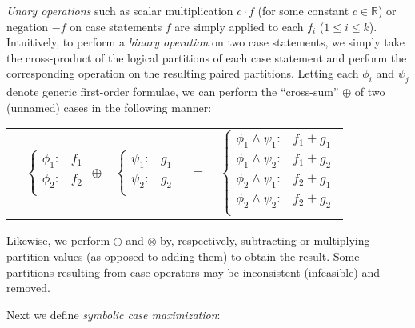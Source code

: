 \emph{Unary operations} such as scalar multiplication $c\cdot f$ (for
some constant $c \in \mathbb{R}$) or negation $-f$ on case statements
$f$ are simply applied to each
$f_i$ ($1 \leq i \leq k$). Intuitively, to perform a \emph{binary
  operation} on two case statements, we simply take the cross-product
of the logical partitions of each case statement and perform the
corresponding operation on the resulting paired partitions.  Letting
each $\phi_i$ and $\psi_j$ denote generic first-order formulae, we can
perform the ``cross-sum'' $\oplus$ of two (unnamed) cases in the
following manner:

{\footnotesize 
\begin{center}
\begin{tabular}{r c c c l}
&
\hspace{-6mm} 
  $\begin{cases}
    \phi_1: & f_1 \\ 
    \phi_2: & f_2 \\ 
  \end{cases}$
$\oplus$
&
\hspace{-4mm}
  $\begin{cases}
    \psi_1: & g_1 \\ 
    \psi_2: & g_2 \\ 
  \end{cases}$
&
\hspace{-2mm} 
$ = $
&
\hspace{-2mm}
  $\begin{cases}
  \phi_1 \wedge \psi_1: & f_1 + g_1 \\ 
  \phi_1 \wedge \psi_2: & f_1 + g_2 \\ 
  \phi_2 \wedge \psi_1: & f_2 + g_1 \\ 
  \phi_2 \wedge \psi_2: & f_2 + g_2 \\ 
  \end{cases}$
\end{tabular}
\end{center}
}
\normalsize

Likewise, we perform $\ominus$ and $\otimes$ by,
respectively, subtracting or multiplying partition values (as opposed
to adding them) to obtain the result.  Some partitions resulting from
case operators may be inconsistent (infeasible) and removed. 

Next we define \emph{symbolic case maximization}:
\vspace{-4mm}

